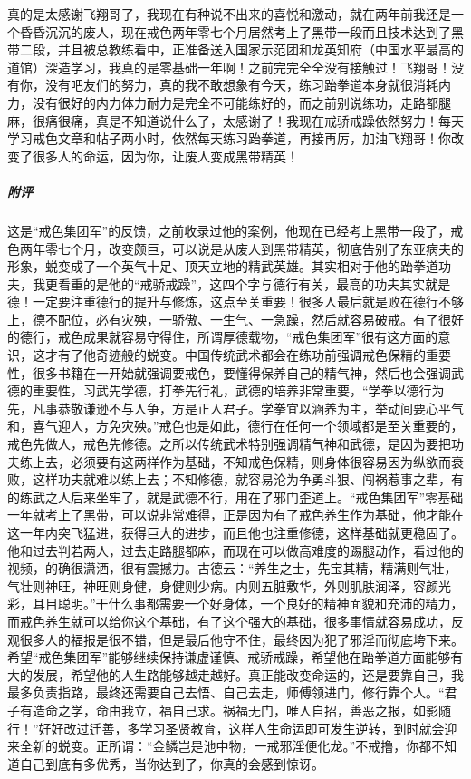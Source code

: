 \begin{case}
    真的是太感谢飞翔哥了，我现在有种说不出来的喜悦和激动，就在两年前我还是一个昏昏沉沉的废人，现在戒色两年零七个月居然考上了黑带一段而且技术达到了黑带二段，并且被总教练看中，正准备送入国家示范团和龙英知府（中国水平最高的道馆）深造学习，我真的是零基础一年啊！之前完完全全没有接触过！飞翔哥！没有你，没有吧友们的努力，真的我不敢想象有今天，练习跆拳道本身就很消耗内力，没有很好的内力体力耐力是完全不可能练好的，而之前别说练功，走路都腿麻，很痛很痛，真是不知道说什么了，太感谢了！我现在戒骄戒躁依然努力！每天学习戒色文章和帖子两小时，依然每天练习跆拳道，再接再厉，加油飞翔哥！你改变了很多人的命运，因为你，让废人变成黑带精英！
    \subparagraph{附评} 这是“戒色集团军”的反馈，之前收录过他的案例，他现在已经考上黑带一段了，戒色两年零七个月，改变颇巨，可以说是从废人到黑带精英，彻底告别了东亚病夫的形象，蜕变成了一个英气十足、顶天立地的精武英雄。其实相对于他的跆拳道功夫，我更看重的是他的“戒骄戒躁”，这四个字与德行有关，最高的功夫其实就是德！一定要注重德行的提升与修炼，这点至关重要！很多人最后就是败在德行不够上，德不配位，必有灾殃，一骄傲、一生气、一急躁，然后就容易破戒。有了很好的德行，戒色成果就容易守得住，所谓厚德载物，“戒色集团军”很有这方面的意识，这才有了他奇迹般的蜕变。中国传统武术都会在练功前强调戒色保精的重要性，很多书籍在一开始就强调要戒色，要懂得保养自己的精气神，然后也会强调武德的重要性，习武先学德，打拳先行礼，武德的培养非常重要，“学拳以德行为先，凡事恭敬谦逊不与人争，方是正人君子。学拳宜以涵养为主，举动间要心平气和，喜气迎人，方免灾殃。”戒色也是如此，德行在任何一个领域都是至关重要的，戒色先做人，戒色先修德。之所以传统武术特别强调精气神和武德，是因为要把功夫练上去，必须要有这两样作为基础，不知戒色保精，则身体很容易因为纵欲而衰败，这样功夫就难以练上去；不知修德，就容易沦为争勇斗狠、闯祸惹事之辈，有的练武之人后来坐牢了，就是武德不行，用在了邪门歪道上。“戒色集团军”零基础一年就考上了黑带，可以说非常难得，正是因为有了戒色养生作为基础，他才能在这一年内突飞猛进，获得巨大的进步，而且他也注重修德，这样基础就更稳固了。他和过去判若两人，过去走路腿都麻，而现在可以做高难度的踢腿动作，看过他的视频，的确很潇洒，很有震撼力。古德云：“养生之士，先宝其精，精满则气壮，气壮则神旺，神旺则身健，身健则少病。内则五脏敷华，外则肌肤润泽，容颜光彩，耳目聪明。”干什么事都需要一个好身体，一个良好的精神面貌和充沛的精力，而戒色养生就可以给你这个基础，有了这个强大的基础，很多事情就容易成功，反观很多人的福报是很不错，但是最后他守不住，最终因为犯了邪淫而彻底垮下来。希望“戒色集团军”能够继续保持谦虚谨慎、戒骄戒躁，希望他在跆拳道方面能够有大的发展，希望他的人生路能够越走越好。真正能改变命运的，还是要靠自己，我最多负责指路，最终还需要自己去悟、自己去走，师傅领进门，修行靠个人。“君子有造命之学，命由我立，福自己求。祸福无门，唯人自招，善恶之报，如影随行！”好好改过迁善，多学习圣贤教育，这样人生命运即可发生逆转，到时就会迎来全新的蜕变。正所谓：“金鳞岂是池中物，一戒邪淫便化龙。”不戒撸，你都不知道自己到底有多优秀，当你达到了，你真的会感到惊讶。
\end{case}

